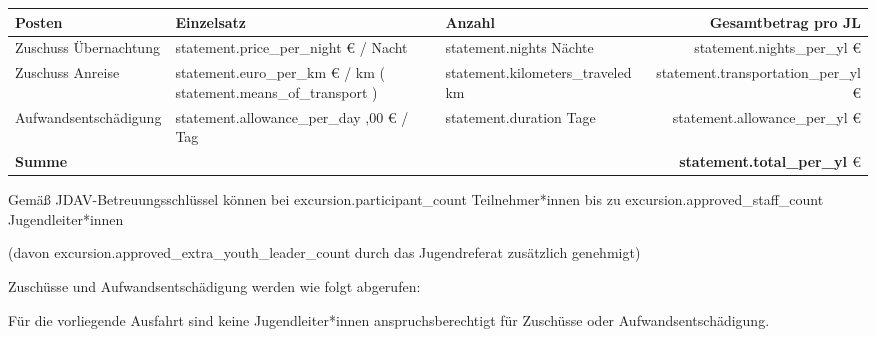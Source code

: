 {{{{{{\begin{table}[H]
    \centering
    \begin{tabularx}{.97\textwidth}{Xllr}
        \toprule
        \textbf{Posten} & \textbf{Einzelsatz} & \textbf{Anzahl} & \textbf{Gesamtbetrag pro JL} \\
        \midrule
        Zuschuss Übernachtung & {{ statement.price_per_night }} € / Nacht  & {{ statement.nights }} Nächte & {{ statement.nights_per_yl }} € \\
        Zuschuss Anreise & {{statement.euro_per_km}} € / km ({{ statement.means_of_transport }}) & {{ statement.kilometers_traveled }} km & {{ statement.transportation_per_yl }} € \\
        Aufwandsentschädigung & {{ statement.allowance_per_day }},00 € / Tag  & {{ statement.duration }} Tage & {{ statement.allowance_per_yl }} € \\
        \midrule
        \textbf{Summe}& & & \textbf{ {{ statement.total_per_yl }} }€\\
        \bottomrule
    \end{tabularx}
\end{table}

\noindent Gemäß JDAV-Betreuungsschlüssel können bei {{ excursion.participant_count }} Teilnehmer*innen
bis zu {{ excursion.approved_staff_count }} Jugendleiter*innen {%
(davon {{ excursion.approved_extra_youth_leader_count }} durch das Jugendreferat zusätzlich genehmigt){%
Zuschüsse und Aufwandsentschädigung werden wie folgt abgerufen:
{%
\noindent Für die vorliegende Ausfahrt sind keine Jugendleiter*innen anspruchsberechtigt für Zuschüsse oder Aufwandsentschädigung.

}}}}}}}}}
